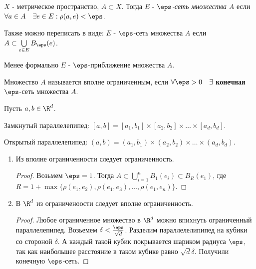 
\begin{definition} \thmslashn

  $X$ - метрическое пространство, $A \subset X$. Тогда $E$ - \textit{$\eps$-сеть множества} $A$ если $\forall a \in A \quad \exists e \in E : \rho(a, e) < \eps$.
  
  Также можно переписать в виде: $E$ - $\eps$-сеть множества $A$ если $A \subset \bigcup\limits_{e \in E}{B_{\eps}(e)}$.

  Менее формально $E$ - $\eps$-приближение множества $A$.
\end{definition}

\begin{definition} \thmslashn

  Множество $A$ называется вполне ограниченным, если $\forall \eps > 0 \quad \exists$ \textbf{конечная}  $\eps$-сеть множества $A$.
  
\end{definition}

\begin{definition} \thmslashn 

    Пусть $a, b\in \R^{d}$.

    Замкнутый параллелепипед: $[a, b] = [a_1, b_1] \times [a_2, b_2] \times\ldots \times [a_{d}, b_{d}]$.

    Открытый параллелепипед: $(a, b) = (a_1, b_1) \times (a_2, b_2) \times \ldots \times (a_{d}, b_{d})$.
\end{definition}

\begin{properties} \thmslashn

  \begin{enumerate}
    \item Из вполне ограниченности следует ограниченность. 
      \begin{proof} \thmslashn

        Возьмем $\eps = 1$. Тогда $A \subset \bigcup\limits_{i = 1}^{n}{B_{1}(e_i)} \subset B_{R}(e_1)$, где $R = 1 + \max\{\rho(e_1, e_2), \rho(e_1, e_3), \dots, \rho(e_1, e_n)\}$.
      \end{proof}
    \item В $\R^d$ из ограниченоости следует вполне ограниченность.
      \begin{proof} \thmslashn

        Любое ограниченное множество в $\R^d$ можно впихнуть ограниченный параллелепипед. Возьемем $\delta < \frac{\eps}{\sqrt{d}}$. Разделим параллелелипипед на кубики со стороной $\delta$. А каждый такой кубик покрывается шариком радиуса $\eps$, так как наибольшее расстояние в таком кубике равно $\sqrt{d}\delta$. Получили конечную $\eps$-сеть.
      \end{proof}
  \end{enumerate}
\end{properties}


